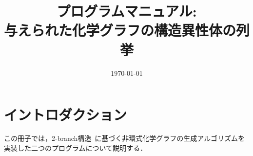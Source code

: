 \documentclass[11pt,titlepage,dvipdfmx,twoside]{jarticle}
\title{\Huge{
プログラムマニュアル: \\
与えられた化学グラフの構造異性体の列挙}}
\begin{document}

\date{\today}

\maketitle


\thispagestyle{empty}
\tableofcontents
\clearpage



\section{イントロダクション}
\label{sec:intro}

この冊子では，2-branch構造~\cite{branch}に基づく非環式化学グラフの生成アルゴリズムを実装した二つのプログラムについて説明する．

%
\end{document}
